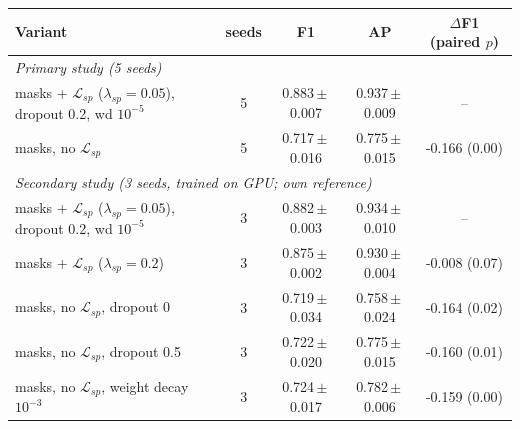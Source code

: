 \begin{tabular}{lcccc}
\toprule
Variant & seeds & F1 & AP & $\Delta$F1 (paired $p$)\\
\midrule
\multicolumn{5}{l}{\textit{Primary study (5 seeds)}}\\
masks + $\mathcal{L}_{sp}$ ($\lambda_{sp}=0.05$), dropout 0.2, wd $10^{-5}$ & 5 & 0.883\,$\pm$\,0.007 & 0.937\,$\pm$\,0.009 & --\\
masks, no $\mathcal{L}_{sp}$ & 5 & 0.717\,$\pm$\,0.016 & 0.775\,$\pm$\,0.015 & -0.166 (0.00)\\
\midrule\multicolumn{5}{l}{\textit{Secondary study (3 seeds, trained on GPU; own reference)}}\\
masks + $\mathcal{L}_{sp}$ ($\lambda_{sp}=0.05$), dropout 0.2, wd $10^{-5}$ & 3 & 0.882\,$\pm$\,0.003 & 0.934\,$\pm$\,0.010 & --\\
masks + $\mathcal{L}_{sp}$ ($\lambda_{sp}=0.2$) & 3 & 0.875\,$\pm$\,0.002 & 0.930\,$\pm$\,0.004 & -0.008 (0.07)\\
masks, no $\mathcal{L}_{sp}$, dropout 0 & 3 & 0.719\,$\pm$\,0.034 & 0.758\,$\pm$\,0.024 & -0.164 (0.02)\\
masks, no $\mathcal{L}_{sp}$, dropout 0.5 & 3 & 0.722\,$\pm$\,0.020 & 0.775\,$\pm$\,0.015 & -0.160 (0.01)\\
masks, no $\mathcal{L}_{sp}$, weight decay $10^{-3}$ & 3 & 0.724\,$\pm$\,0.017 & 0.782\,$\pm$\,0.006 & -0.159 (0.00)\\
\bottomrule
\end{tabular}
